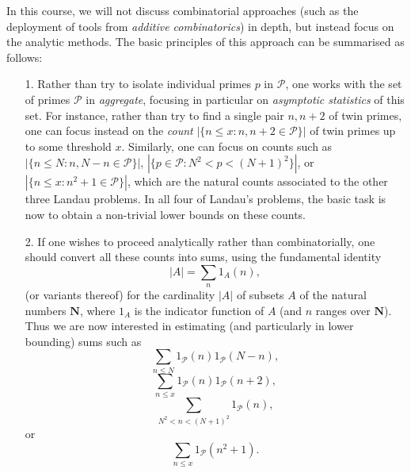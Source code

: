 \documentclass[10pt,reqno]{amsart}
\begin{document}
In this course, we will not discuss combinatorial approaches (such as the deployment of tools from \emph{additive combinatorics}) in depth, but instead focus on the analytic methods. The basic principles of this approach can be summarised as follows:
%
\begin{enumerate}
    \item[1.] Rather than try to isolate individual primes $p$ in $\mathcal{P}$, one works with the set of primes $\mathcal{P}$ in \emph{aggregate}, focusing in particular on \emph{asymptotic statistics} of this set. For instance, rather than try to find a single pair $n,n+2$ of twin primes, one can focus instead on the \emph{count} $|\{ n \leq x: n,n+2 \in {\mathcal P} \}|$ of twin primes up to some threshold $x$. Similarly, one can focus on counts such as $|\{ n \leq N: n, N-n \in {\mathcal P} \}|$, $|\{ p \in {\mathcal P}: N^2 < p < (N+1)^2 \}|$, or $|\{ n \leq x: n^2 + 1 \in {\mathcal P} \}|$, which are the natural counts associated to the other three Landau problems. In all four of Landau’s problems, the basic task is now to obtain a non-trivial lower bounds on these counts.

    \item[2.] If one wishes to proceed analytically rather than combinatorially, one should convert all these counts into sums, using the fundamental identity
    \[ |A| = \sum_n 1_A(n), \]
    (or variants thereof) for the cardinality $|A|$ of subsets $A$ of the natural numbers $\mathbf{N}$, where $1_A$ is the indicator function of $A$ (and $n$ ranges over $\mathbf{N}$). Thus we are now interested in estimating (and particularly in lower bounding) sums such as
    \[ \sum_{n \leq N} 1_{{\mathcal P}}(n) 1_{{\mathcal P}}(N-n), \]
    \[ \sum_{n \leq x} 1_{{\mathcal P}}(n) 1_{{\mathcal P}}(n+2), \]
    \[ \sum_{N^2 < n < (N+1)^2} 1_{{\mathcal P}}(n), \]
    or
    \[ \sum_{n \leq x} 1_{{\mathcal P}}(n^2+1). \]


\end{enumerate}
\end{document}
